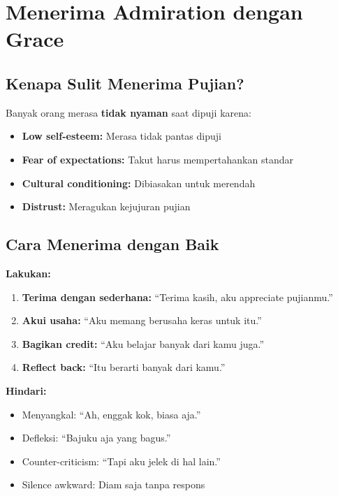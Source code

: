 \section{Menerima Admiration dengan Grace}

\subsection{Kenapa Sulit Menerima Pujian?}

Banyak orang merasa \textbf{tidak nyaman} saat dipuji karena:
\begin{itemize}
    \item \textbf{Low self-esteem:} Merasa tidak pantas dipuji
    \item \textbf{Fear of expectations:} Takut harus mempertahankan standar
    \item \textbf{Cultural conditioning:} Dibiasakan untuk merendah
    \item \textbf{Distrust:} Meragukan kejujuran pujian
\end{itemize}

\subsection{Cara Menerima dengan Baik}

\begin{tipbox}
\textbf{Lakukan:}
\begin{enumerate}
    \item \textbf{Terima dengan sederhana:} ``Terima kasih, aku appreciate pujianmu.''
    \item \textbf{Akui usaha:} ``Aku memang berusaha keras untuk itu.''
    \item \textbf{Bagikan credit:} ``Aku belajar banyak dari kamu juga.''
    \item \textbf{Reflect back:} ``Itu berarti banyak dari kamu.''
\end{enumerate}

\textbf{Hindari:}
\begin{itemize}
    \item Menyangkal: ``Ah, enggak kok, biasa aja.''
    \item Defleksi: ``Bajuku aja yang bagus.''
    \item Counter-criticism: ``Tapi aku jelek di hal lain.''
    \item Silence awkward: Diam saja tanpa respons
\end{itemize}
\end{tipbox}

